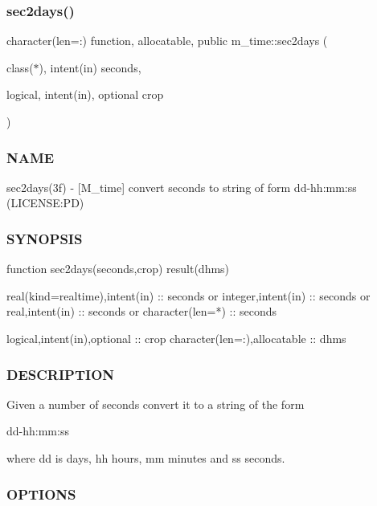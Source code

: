 \subsubsection{\texorpdfstring{sec2days()}{sec2days()}}
{\footnotesize\ttfamily character(len=\+:) function, allocatable, public m\+\_\+time\+::sec2days (\begin{DoxyParamCaption}\item[{class($\ast$), intent(in)}]{seconds,  }\item[{logical, intent(in), optional}]{crop }\end{DoxyParamCaption})}



\subsubsection*{N\+A\+ME}

sec2days(3f) -\/ \mbox{[}M\+\_\+time\mbox{]} convert seconds to string of form dd-\/hh\+:mm\+:ss (L\+I\+C\+E\+N\+SE\+:PD) 

\subsubsection*{S\+Y\+N\+O\+P\+S\+IS}

\begin{DoxyVerb}function sec2days(seconds,crop) result(dhms)

 real(kind=realtime),intent(in) :: seconds
   or
 integer,intent(in)             :: seconds
   or
 real,intent(in)                :: seconds
   or
 character(len=*)               :: seconds

 logical,intent(in),optional    :: crop
 character(len=:),allocatable   :: dhms
\end{DoxyVerb}


\subsubsection*{D\+E\+S\+C\+R\+I\+P\+T\+I\+ON}

Given a number of seconds convert it to a string of the form \begin{DoxyVerb}dd-hh:mm:ss
\end{DoxyVerb}


where dd is days, hh hours, mm minutes and ss seconds.

\subsubsection*{O\+P\+T\+I\+O\+NS}

